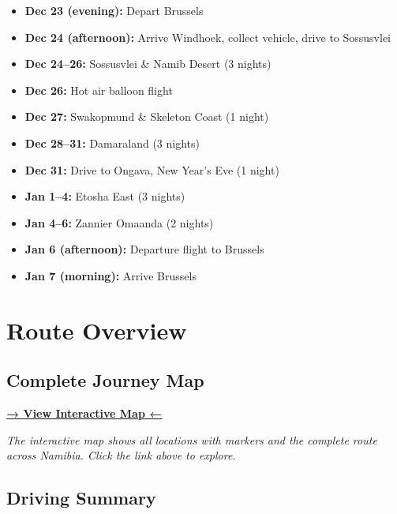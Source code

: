 \documentclass[11pt]{article}
\begin{document}
\begin{itemize}
    \item \textbf{Dec 23 (evening):} Depart Brussels
    \item \textbf{Dec 24 (afternoon):} Arrive Windhoek, collect vehicle, drive to Sossusvlei
    \item \textbf{Dec 24--26:} Sossusvlei \& Namib Desert (3 nights)
    \item \textbf{Dec 26:} Hot air balloon flight
    \item \textbf{Dec 27:} Swakopmund \& Skeleton Coast (1 night)
    \item \textbf{Dec 28--31:} Damaraland (3 nights)
    \item \textbf{Dec 31:} Drive to Ongava, New Year's Eve (1 night)
    \item \textbf{Jan 1--4:} Etosha East (3 nights)
    \item \textbf{Jan 4--6:} Zannier Omaanda (2 nights)
    \item \textbf{Jan 6 (afternoon):} Departure flight to Brussels
    \item \textbf{Jan 7 (morning):} Arrive Brussels
\end{itemize}

\clearpage
\section{Route Overview}

\subsection{Complete Journey Map}

\begin{center}
\Large\textbf{\href{images/route_map.html}{→ View Interactive Map ←}}
\end{center}

\vspace{1em}
\noindent\textit{The interactive map shows all locations with markers and the complete route across Namibia. Click the link above to explore.}

\subsection{Driving Summary}
\end{document}
